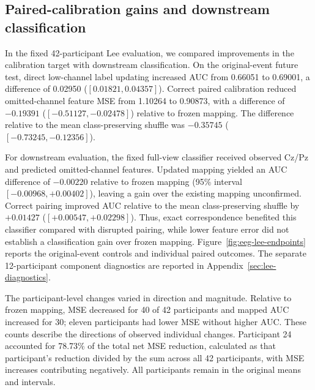 \documentclass[11pt,a4paper]{article}
\begin{document}
\subsection{Paired-calibration gains and downstream classification}
\label{sec:mapped-task}

In the fixed 42-participant Lee evaluation, we compared improvements in the calibration target with downstream classification. On the original-event future test, direct low-channel label updating increased AUC from 0.66051 to 0.69001, a difference of 0.02950 ($[0.01821,0.04357]$). Correct paired calibration reduced omitted-channel feature MSE from 1.10264 to 0.90873, with a difference of $-0.19391$ ($[-0.51127,-0.02478]$) relative to frozen mapping. The difference relative to the mean class-preserving shuffle was $-0.35745$ ($[-0.73245,-0.12356]$).

For downstream evaluation, the fixed full-view classifier received observed Cz/Pz and predicted omitted-channel features. Updated mapping yielded an AUC difference of $-0.00220$ relative to frozen mapping (95\% interval $[-0.00968,+0.00402]$), leaving a gain over the existing mapping unconfirmed. Correct pairing improved AUC relative to the mean class-preserving shuffle by $+0.01427$ ($[+0.00547,+0.02298]$). Thus, exact correspondence benefited this classifier compared with disrupted pairing, while lower feature error did not establish a classification gain over frozen mapping. Figure~\ref{fig:eeg-lee-endpoints} reports the original-event controls and individual paired outcomes. The separate 12-participant component diagnostics are reported in Appendix~\ref{sec:lee-diagnostics}.

The participant-level changes varied in direction and magnitude. Relative to frozen mapping, MSE decreased for 40 of 42 participants and mapped AUC increased for 30; eleven participants had lower MSE without higher AUC. These counts describe the directions of observed individual changes. Participant 24 accounted for 78.73\% of the total net MSE reduction, calculated as that participant's reduction divided by the sum across all 42 participants, with MSE increases contributing negatively. All participants remain in the original means and intervals.
\end{document}
